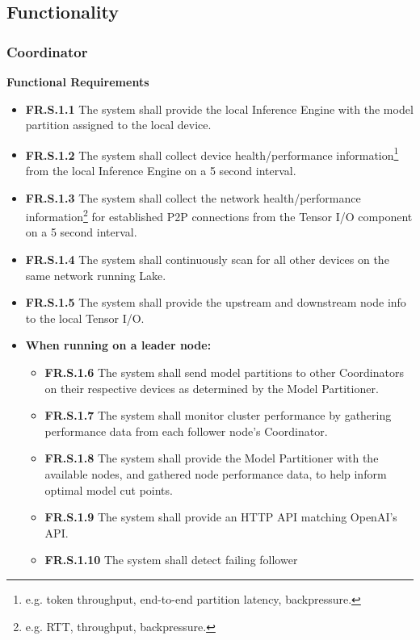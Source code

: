 \documentclass[12pt]{article}
\begin{document}
\subsection{Functionality}\label{subsec:functionality}
\subsubsection{Coordinator}
\textbf{Functional Requirements}
\begin{itemize}
	\item \label{FR.S.1.1}\textbf{FR.S.1.1} The system shall provide the local Inference Engine with the model partition
		assigned to the local device.
	\item \label{FR.S.1.2}\textbf{FR.S.1.2} The system shall collect device health/performance
		information\footnote{e.g. token throughput, end-to-end partition latency, backpressure.}
		from the local Inference Engine on a 5 second interval.
	\item \label{FR.S.1.3}\textbf{FR.S.1.3} The system shall collect the network health/performance
		information\footnote{e.g. RTT, throughput, backpressure.}
		for established P2P connections from the Tensor I/O component on a 5 second interval.
	\item \label{FR.S.1.4}\textbf{FR.S.1.4} The system shall continuously scan for all other devices on the same network
		running Lake.
	\item \label{FR.S.1.5}\textbf{FR.S.1.5} The system shall provide the upstream and downstream node info to the
		local Tensor I/O.
	\item \textbf{When running on a leader node:}
		\begin{itemize}
			\item \label{FR.S.1.6}\textbf{FR.S.1.6} The system shall send model partitions to other Coordinators on their
				respective devices as determined by the Model Partitioner.
			\item \label{FR.S.1.7}\textbf{FR.S.1.7} The system shall monitor cluster performance by gathering performance
				data from each follower node's Coordinator.
			\item \label{FR.S.1.8}\textbf{FR.S.1.8} The system shall provide the Model Partitioner with the available nodes,
				and gathered node performance data, to help inform optimal model cut points.
			\item \label{FR.S.1.9}\textbf{FR.S.1.9} The system shall provide an HTTP API matching OpenAI's API.
			\item \label{FR.S.1.10}\textbf{FR.S.1.10} The system shall detect failing follower

\end{itemize}
\end{itemize}
\end{document}

